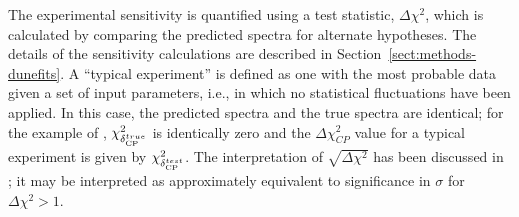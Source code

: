 The experimental sensitivity is quantified using a test statistic, $\Delta\chi^2$, which is calculated by comparing the predicted spectra for alternate hypotheses.  The details of the sensitivity calculations are described in Section~\ref{sect:methods-dunefits}. 
A ``typical experiment'' is defined as one with the most probable data given a set of input parameters, i.e., in which no statistical fluctuations have been applied. In this case, the predicted spectra and the true spectra are identical; for the example of , $\chi^2_{\delta_{\rm CP}^{true}}$ is identically zero and the $\Delta\chi^2_{CP}$ value for a typical experiment is given by $\chi^2_{\delta_{\rm CP}^{test}}$. The interpretation of $\sqrt{\Delta\chi^2}$ has been discussed in \cite{Qian:2012zn,Blennow:2013oma}; it may be interpreted as approximately equivalent to significance in $\sigma$ for $\Delta\chi^2>1$. 


